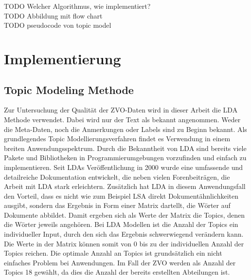 \documentclass[german,version-2020-11]{uzl-thesis}
\begin{document}
TODO Welcher Algorithmus, wie implementiert? \\
TODO Abbildung mit flow chart\\
TODO pseudocode von topic model


\chapter{Implementierung}%

\section{Topic Modeling Methode}
Zur Untersuchung der Qualität der ZVO-Daten wird in dieser Arbeit die LDA Methode verwendet. Dabei wird nur der Text als bekannt angenommen. Weder die Meta-Daten, noch die Anmerkungen oder Labels sind zu Beginn bekannt. Als grundlegendes Topic Modellierungsverfahren findet es Verwendung in einem breiten Anwendungsspektrum. Durch die Bekanntheit von LDA sind bereits viele Pakete und Bibliotheken in Programmierumgebungen vorzufinden und einfach zu implementieren. Seit LDAs Veröffentlichung in 2000 wurde eine umfassende und detailreiche Dokumentation entwickelt, die neben vielen Forenbeiträgen, die Arbeit mit LDA stark erleichtern. Zusätzlich hat LDA in diesem Anwendungsfall den Vorteil, dass es nicht wie zum Beispiel LSA direkt Dokumentähnlichkeiten ausgibt, sondern das Ergebnis in Form einer Matrix dartellt, die Wörter auf Dokumente abbildet. Damit ergeben sich als Werte der Matrix die Topics, denen die Wörter jeweils angehören. Bei LDA Modellen ist die Anzahl der Topics ein individueller Input, durch den sich das Ergebnis schwerwiegend verändern kann. Die Werte in der Matrix können somit von $0$ bis zu der individuellen Anzahl der Topics reichen. Die optimale Anzahl an Topics ist grundsätzlich ein nicht einfaches Problem bei Anwendungen. Im Fall der ZVO werden als Anzahl der Topics 18  gewählt, da dies die Anzahl der bereits erstellten Abteilungen ist. 
\end{document}
